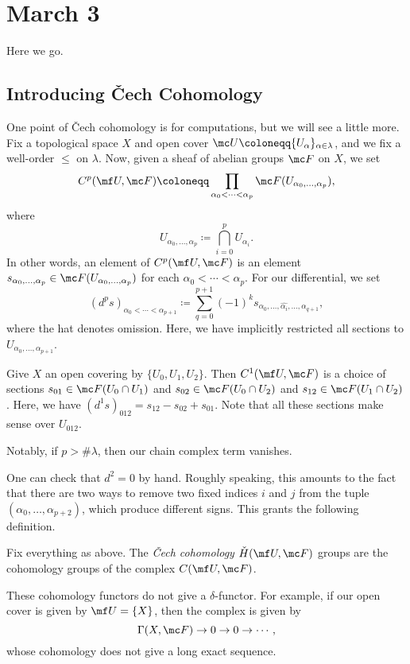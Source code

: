 \documentclass[../notes.tex]{subfiles}
\begin{document}
\section{March 3}

Here we go.

\subsection{Introducing \v Cech Cohomology}
One point of \v Cech cohomology is for computations, but we will see a little more. Fix a topological space $X$ and open cover $\mc U\coloneqq\{U_\alpha\}_{\alpha\in\lambda}$, and we fix a well-order $\le$ on $\lambda$. Now, given a sheaf of abelian groups $\mc F$ on $X$, we set
\[C^p(\mf U,\mc F)\coloneqq\prod_{\alpha_0<\cdots<\alpha_p}\mc F(U_{\alpha_0,\ldots,\alpha_p}),\]
where
\[U_{\alpha_0,\ldots,\alpha_p}\coloneqq\bigcap_{i=0}^pU_{\alpha_i}.\]
In other words, an element of $C^p(\mf U,\mc F)$ is an element $s_{\alpha_0,\ldots,\alpha_p}\in\mc F(U_{\alpha_0,\ldots,\alpha_p})$ for each $\alpha_0<\cdots<\alpha_p$. For our differential, we set
\[\left(d^ps\right)_{\alpha_0<\cdots<\alpha_{p+1}}\coloneqq\sum_{q=0}^{p+1}(-1)^ks_{\alpha_0,\ldots,\widehat{\alpha_i},\ldots,\alpha_{q+1}},\]
where the hat denotes omission. Here, we have implicitly restricted all sections to $U_{\alpha_0,\ldots,\alpha_{p+1}}$.
\begin{example}
	Give $X$ an open covering by $\{U_0,U_1,U_2\}$. Then $C^1(\mf U,\mc F)$ is a choice of sections $s_{01}\in\mc F(U_0\cap U_1)$ and $s_{02}\in\mc F(U_0\cap U_2)$ and $s_{12}\in\mc F(U_1\cap U_2)$. Here, we have $\left(d^1s\right)_{012}=s_{12}-s_{02}+s_{01}$. Note that all these sections make sense over $U_{012}$.
\end{example}
\begin{remark}
	Notably, if $p>\#\lambda$, then our chain complex term vanishes.
\end{remark}
One can check that $d^2=0$ by hand. Roughly speaking, this amounts to the fact that there are two ways to remove two fixed indices $i$ and $j$ from the tuple $(\alpha_0,\ldots,\alpha_{p+2})$, which produce different signs. This grants the following definition.
\begin{defihelper} 
	Fix everything as above. The \textit{\v Cech cohomology} $\check H(\mf U,\mc F)$ groups are the cohomology groups of the complex $C(\mf U,\mc F)$.
\end{defihelper}
\begin{remark}
	These cohomology functors do not give a $\delta$-functor. For example, if our open cover is given by $\mf U=\{X\}$, then the complex is given by
	\[\Gamma(X,\mc F)\to0\to0\to\cdots,\]
	whose cohomology does not give a long exact sequence.
\end{remark}
\end{document}
